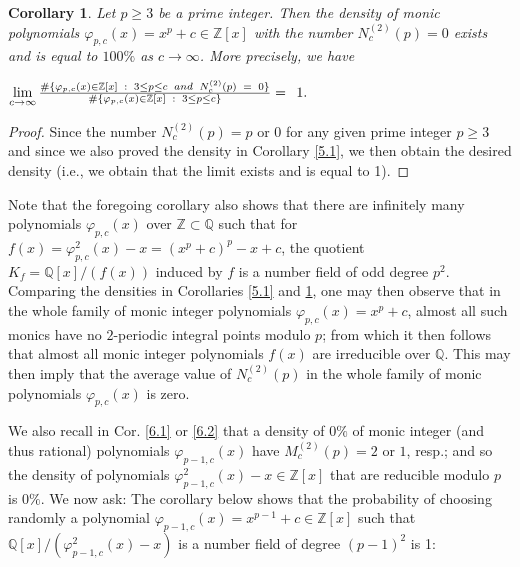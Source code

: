\documentclass{article}
\theoremstyle{plain}
\newtheorem{cor}[thm]{Corollary}
\theoremstyle{definition}
\begin{document}
\begin{cor} \label{7.1}
Let $p\geq 3$ be a prime integer. Then the density of monic polynomials $\varphi_{p,c}(x) = x^p + c\in \mathbb{Z}[x]$ with the number $N_{c}^{(2)}(p) = 0$ exists and is equal to $100 \%$ as $c\to \infty$. More precisely, we have
\begin{center}
    $\lim\limits_{c\to\infty} \Large{\frac{\# \{\varphi_{p, c}(x)\in \mathbb{Z}[x] \ : \ 3\leq p\leq c \ and \ N_{c}^{(2)}(p) \ = \ 0 \}}{\Large{\# \{\varphi_{p,c}(x) \in \mathbb{Z}[x] \ : \ 3\leq p\leq c \}}}} = \ 1.$
\end{center}
\end{cor}

\begin{proof}
Since the number $N_{c}^{(2)}(p) = p$ or $0$ for any given prime integer $p\geq 3$ and since we also proved the density in Corollary \ref{5.1}, we then obtain the desired density (i.e., we obtain that the limit exists and is equal to 1). 
\end{proof}


\noindent Note that the foregoing corollary also shows that there are infinitely many polynomials $\varphi_{p,c}(x)$ over $\mathbb{Z}\subset \mathbb{Q}$ such that for $f(x) = \varphi_{p,c}^2(x)-x = (x^p+c)^p-x+c$, the  quotient $K_{f} = \mathbb{Q}[x]\slash (f(x))$ induced by $f$ is a number field of odd degree $p^2$. Comparing the densities in Corollaries \ref{5.1} and \ref{7.1}, one may then observe that in the whole family of monic integer polynomials $\varphi_{p,c}(x) = x^p +c$, almost all such monics have no $2$-periodic integral points modulo $p$; from which it then follows that almost all monic integer polynomials $f(x)$ are irreducible over $\mathbb{Q}$. This may then imply that the average value of $N_{c}^{(2)}(p)$ in the whole family of monic polynomials $\varphi_{p,c}(x)$ is zero.


We also recall in Cor. \ref{6.1} or \ref{6.2} that a density of $0\%$ of monic integer (and thus rational) polynomials $\varphi_{p-1,c}(x)$ have $M_{c}^{(2)}(p) = 2$ or $1$, resp.; and so the density of polynomials $\varphi_{p-1, c}^2(x)-x\in \mathbb{Z}[x]$ that are reducible modulo $p$ is $0\%$. We now ask:  The corollary below shows that the probability of choosing randomly a polynomial $\varphi_{p-1,c}(x) = x^{p-1}+c\in \mathbb{Z}[x]$ such that $\mathbb{Q}[x]\slash (\varphi_{p-1, c}^2(x)-x)$ is a number field of degree $(p-1)^2$ is 1:
\end{document}
